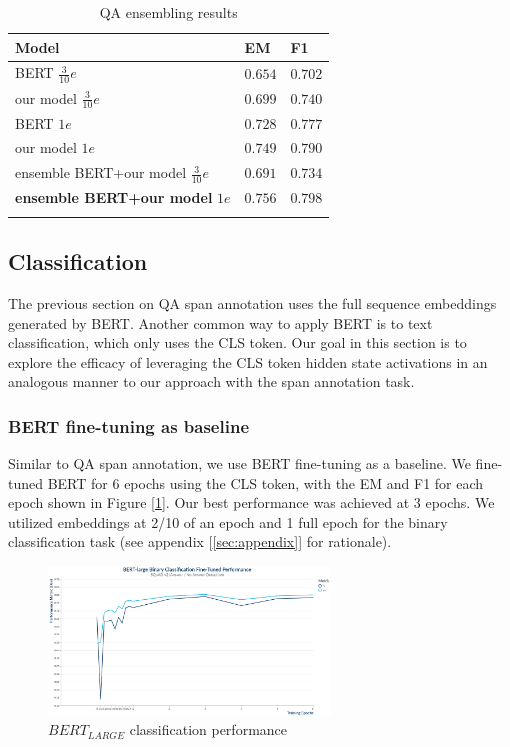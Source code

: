 \begin{table}[ht]
	\centering
	\small
	\begin{tabular}{L{4.2cm} C{0.9cm} C{0.9cm}}
		\hline\Tstrut\Bstrut
		\textbf{Model} & \textbf{EM} & \textbf{F1} \\
		\hline\Tstrut\Bstrut
		BERT $\frac{3}{10}e$     					& $0.654$  & $0.702$ \\[.1cm]
		our model $\frac{3}{10}e$ 					& $0.699$  & $0.740$ \\[.1cm]
		BERT $1e$     								& $0.728$  & $0.777$ \\[.1cm]
		our model $1e$ 								& $0.749$  & $0.790$ \\[.1cm]
		ensemble BERT+our model $\frac{3}{10}e$		& $0.691$  & $0.734$ \\[.1cm]
		\hline\hline\Tstrut\Bstrut
		\textbf{ensemble BERT+our model} \boldmath$1e$  & \boldmath$0.756$  & \boldmath$0.798$ \\[.1cm]
		\hline\hline\Tstrut\Bstrut
	\end{tabular}
	\caption{\label{tbl:qa_ensembling}QA ensembling results}
\end{table} 

\subsection{Classification}

The previous section on QA span annotation uses the full sequence embeddings generated by BERT. Another common way to apply BERT is to text classification, which only uses the CLS token. Our goal in this section is to explore the efficacy of leveraging the CLS token hidden state activations in an analogous manner to our approach with the span annotation task. 

\subsubsection{BERT fine-tuning as baseline}

Similar to QA span annotation, we use BERT fine-tuning as a baseline. We fine-tuned BERT for 6 epochs using the CLS token, with the EM and F1 for each epoch shown in Figure [\ref{fig:bc_bert_performance}]. Our best performance was achieved at 3 epochs. We utilized embeddings at 2/10 of an epoch and 1 full epoch for the binary classification task (see appendix [\ref{sec:appendix}] for rationale).

\begin{figure}[ht]
	\centering
	\includegraphics[width=7.5cm]{images/BinaryClassification_BERT_Training_Performance_plot.png}
	\caption{\label{fig:bc_bert_performance}$BERT_{LARGE}$ classification performance}
\end{figure}

